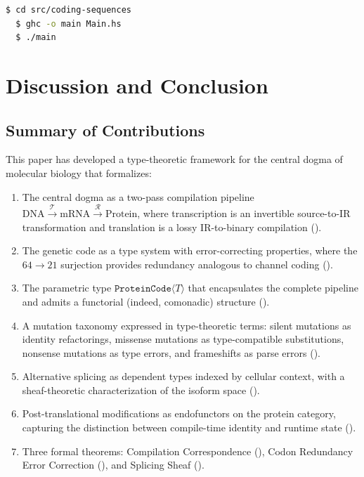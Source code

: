 \documentclass[12pt,a4paper]{article}
\theoremstyle{definition}
\begin{document}
\begin{lstlisting}[language=bash,keywords={ghc,runghc}]
  $ cd src/coding-sequences
  $ ghc -o main Main.hs
  $ ./main
\end{lstlisting}


\section{Discussion and Conclusion}\label{sec:discussion}

\subsection{Summary of Contributions}

This paper has developed a type-theoretic framework for the central dogma of molecular biology that formalizes:

\begin{enumerate}[label=(\roman*)]
  \item The central dogma as a two-pass compilation pipeline $\text{DNA} \xrightarrow{\mathcal{T}} \text{mRNA} \xrightarrow{\mathcal{R}} \text{Protein}$, where transcription is an invertible source-to-IR transformation and translation is a lossy IR-to-binary compilation ().

  \item The genetic code as a type system with error-correcting properties, where the $64 \to 21$ surjection provides redundancy analogous to channel coding ().

  \item The parametric type $\texttt{ProteinCode}\langle T \rangle$ that encapsulates the complete pipeline and admits a functorial (indeed, comonadic) structure ().

  \item A mutation taxonomy expressed in type-theoretic terms: silent mutations as identity refactorings, missense mutations as type-compatible substitutions, nonsense mutations as type errors, and frameshifts as parse errors ().

  \item Alternative splicing as dependent types indexed by cellular context, with a sheaf-theoretic characterization of the isoform space ().

  \item Post-translational modifications as endofunctors on the protein category, capturing the distinction between compile-time identity and runtime state ().

  \item Three formal theorems: Compilation Correspondence (), Codon Redundancy Error Correction (), and Splicing Sheaf ().
\end{enumerate}
\end{document}
